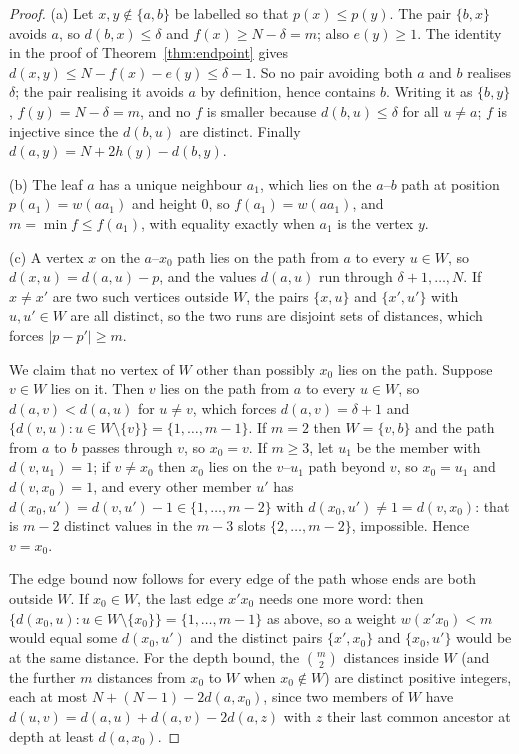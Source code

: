 \documentclass[11pt,a4paper]{article}
\theoremstyle{plain}
\theoremstyle{remark}
\newcommand{\bin}[2]{\binom{#1}{#2}}
\begin{document}
\begin{proof}
(a) Let $x,y\notin\{a,b\}$ be labelled so that $p(x)\le p(y)$.  The pair
$\{b,x\}$ avoids $a$, so $d(b,x)\le\delta$ and $f(x)\ge N-\delta=m$; also
$e(y)\ge1$.  The identity in the proof of Theorem~\ref{thm:endpoint} gives
$d(x,y)\le N-f(x)-e(y)\le\delta-1$.  So no pair avoiding both $a$ and $b$
realises $\delta$; the pair realising it avoids $a$ by definition, hence
contains $b$.  Writing it as $\{b,y\}$, $f(y)=N-\delta=m$, and no $f$ is
smaller because $d(b,u)\le\delta$ for all $u\ne a$; $f$ is injective since the
$d(b,u)$ are distinct.  Finally $d(a,y)=N+2h(y)-d(b,y)$.

(b) The leaf $a$ has a unique neighbour $a_1$, which lies on the $a$--$b$ path
at position $p(a_1)=w(aa_1)$ and height $0$, so $f(a_1)=w(aa_1)$, and
$m=\min f\le f(a_1)$, with equality exactly when $a_1$ is the vertex $y$.

(c) A vertex $x$ on the $a$--$x_0$ path lies on the path from $a$ to every
$u\in W$, so $d(x,u)=d(a,u)-p$, and the values $d(a,u)$ run through
$\delta+1,\dots,N$.  If $x\ne x'$ are two such vertices outside $W$, the pairs
$\{x,u\}$ and $\{x',u'\}$ with $u,u'\in W$ are all distinct, so the two runs
are disjoint sets of distances, which forces $|p-p'|\ge m$.

We claim that no vertex of $W$ other than possibly $x_0$ lies on the path.
Suppose $v\in W$ lies on it.  Then $v$ lies on the path from $a$ to every
$u\in W$, so $d(a,v)<d(a,u)$ for $u\ne v$, which forces $d(a,v)=\delta+1$ and
$\{d(v,u):u\in W\setminus\{v\}\}=\{1,\dots,m-1\}$.  If $m=2$ then
$W=\{v,b\}$ and the path from $a$ to $b$ passes through $v$, so $x_0=v$.  If
$m\ge3$, let $u_1$ be the member with $d(v,u_1)=1$; if $v\ne x_0$ then $x_0$
lies on the $v$--$u_1$ path beyond $v$, so $x_0=u_1$ and $d(v,x_0)=1$, and
every other member $u'$ has $d(x_0,u')=d(v,u')-1\in\{1,\dots,m-2\}$ with
$d(x_0,u')\ne1=d(v,x_0)$: that is $m-2$ distinct values in the $m-3$ slots
$\{2,\dots,m-2\}$, impossible.  Hence $v=x_0$.

The edge bound now follows for every edge of the path whose ends are both
outside $W$.  If $x_0\in W$, the last edge $x'x_0$ needs one more word: then
$\{d(x_0,u):u\in W\setminus\{x_0\}\}=\{1,\dots,m-1\}$ as above, so a weight
$w(x'x_0)<m$ would equal some $d(x_0,u')$ and the distinct pairs $\{x',x_0\}$
and $\{x_0,u'\}$ would be at the same distance.  For the depth bound, the $\bin m2$ distances inside $W$ (and
the further $m$ distances from $x_0$ to $W$ when $x_0\notin W$) are distinct
positive integers, each at most $N+(N-1)-2d(a,x_0)$, since two members of $W$
have $d(u,v)=d(a,u)+d(a,v)-2d(a,z)$ with $z$ their last common ancestor at
depth at least $d(a,x_0)$.
\end{proof}
\end{document}
